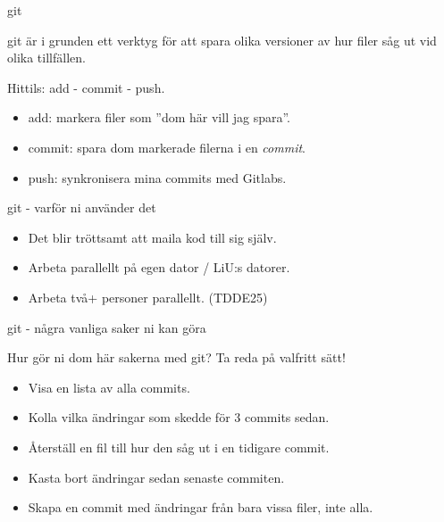 \documentclass{beamer}
\begin{document}
  \begin{frame}{git}

    git är i grunden ett verktyg för att spara olika versioner av hur filer såg
    ut vid olika tillfällen.

    Hittils: add - commit - push.

    \pause{}

    \begin{itemize}[<+->]
      \item add: markera filer som ''dom här vill jag spara''.
      \item commit: spara dom markerade filerna i en \emph{commit}.
      \item push: synkronisera mina commits med Gitlabs.
    \end{itemize}

  \end{frame}

  \begin{frame}{git - varför ni använder det}

    \pause{}

    \begin{itemize}[<+->]
      \item Det blir tröttsamt att maila kod till sig själv.
      \item Arbeta parallellt på egen dator / LiU:s datorer.
      \item Arbeta två+ personer parallellt. (TDDE25)
    \end{itemize}

  \end{frame}

  \begin{frame}{git - några vanliga saker ni kan göra}

    Hur gör ni dom här sakerna med git? Ta reda på valfritt sätt!

    \begin{itemize}
      \item Visa en lista av alla commits.
      \item Kolla vilka ändringar som skedde för 3 commits sedan.
      \item Återställ en fil till hur den såg ut i en tidigare commit.
      \item Kasta bort ändringar sedan senaste commiten.
      \item Skapa en commit med ändringar från bara vissa filer, inte alla.
    \end{itemize}
  \end{frame}
\end{document}
